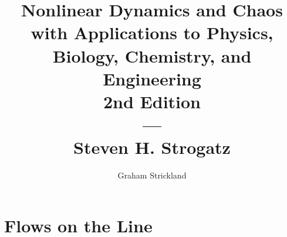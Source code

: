 \documentclass{article}
\title{
    Nonlinear Dynamics and Chaos with Applications to Physics, Biology, Chemistry,
    and Engineering\\2nd Edition\\---\\Steven H. Strogatz
}
\author{Graham Strickland}
\numberwithin{figure}{section}
\numberwithin{equation}{section}
\begin{document}
\maketitle  

\setcounter{section}{1}
\section{Flows on the Line}

\end{document}

